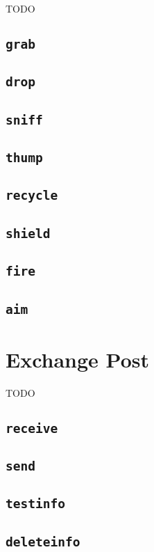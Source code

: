TODO

\subsection{\texttt{grab}}
\subsection{\texttt{drop}}
\subsection{\texttt{sniff}}
\subsection{\texttt{thump}}
\subsection{\texttt{recycle}}
\subsection{\texttt{shield}}
\subsection{\texttt{fire}}
\subsection{\texttt{aim}}


\section{Exchange Post}

TODO

\subsection{\texttt{receive}}
\subsection{\texttt{send}}
\subsection{\texttt{testinfo}}
\subsection{\texttt{deleteinfo}}


